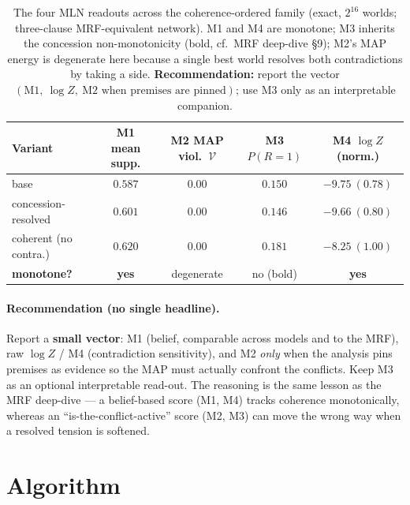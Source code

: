 \documentclass[11pt]{article}
\begin{document}
\begin{table}[h]\centering\small
\renewcommand{\arraystretch}{1.15}
\begin{tabular}{@{}lcccc@{}}
\toprule
\textbf{Variant} & M1 mean supp. & M2 MAP viol.\ $\mathcal V$ & M3 $P(R{=}1)$ & M4 $\log Z$ (norm.)\\
\midrule
base                    & $0.587$ & $0.00$ & $0.150$ & $-9.75\ (0.78)$\\
concession-resolved     & $0.601$ & $0.00$ & $\mathbf{0.146}$ & $-9.66\ (0.80)$\\
coherent (no contra.)   & $0.620$ & $0.00$ & $0.181$ & $-8.25\ (1.00)$\\
\midrule
\textbf{monotone?}      & \textbf{yes} & degenerate & no (bold) & \textbf{yes}\\
\bottomrule
\end{tabular}
\caption{The four MLN readouts across the coherence-ordered family (exact, $2^{16}$ worlds;
three-clause MRF-equivalent network). M1 and M4 are monotone; M3 inherits the concession
non-monotonicity (bold, cf.\ MRF deep-dive \S9); M2's MAP energy is degenerate here because a
single best world resolves both contradictions by taking a side. \textbf{Recommendation:}
report the vector $(\text{M1},\ \log Z,\ \text{M2 when premises are pinned})$; use M3 only as
an interpretable companion.}
\label{tab:menu}
\end{table}

\paragraph{Recommendation (no single headline).} Report a \textbf{small vector}: M1 (belief,
comparable across models and to the MRF), raw $\log Z$ / M4 (contradiction sensitivity), and
M2 \emph{only} when the analysis pins premises as evidence so the MAP must actually confront
the conflicts. Keep M3 as an optional interpretable read-out. The reasoning is the same
lesson as the MRF deep-dive --- a belief-based score (M1, M4) tracks coherence monotonically,
whereas an ``is-the-conflict-active'' score (M2, M3) can move the wrong way when a resolved
tension is softened.

\section{Algorithm}
\label{sec:algo}
\end{document}
